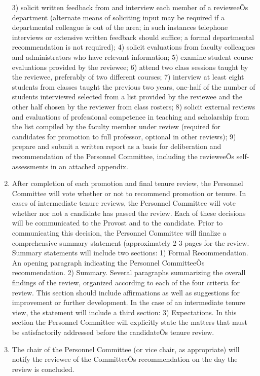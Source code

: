 \documentclass[letterpaper, 11pt]{article}
\begin{document}
\begin{enumerate}[label=\alph*)]
					3) solicit written feedback from and interview each member of a revieweeÕs department (alternate means of soliciting input may be required if a departmental colleague is out of the area; in such instances telephone interviews or extensive written feedback should suffice; a formal departmental recommendation is not required);
					4) solicit evaluations from faculty colleagues and administrators who have relevant information;
					5) examine student course evaluations provided by the reviewee;
					6) attend two class sessions taught by the reviewee, preferably of two different courses;
					7) interview at least eight students from classes taught the previous two years, one-half of the number of students interviewed selected from a list provided by the reviewee and the other half chosen by the reviewer from class rosters;
					8) solicit external reviews and evaluations of professional competence in teaching and scholarship from the list compiled by the faculty member under review (required for candidates for promotion to full professor, optional in other reviews);
					9) prepare and submit a written report as a basis for deliberation and recommendation of the Personnel Committee, including the revieweeÕs self-assessments in an attached appendix.
					\item{After completion of each promotion and final tenure review, the Personnel Committee will vote whether or not to recommend promotion or tenure.  In cases of intermediate tenure reviews, the Personnel Committee will vote whether nor not a candidate has passed the review.  Each of these decisions will be communicated to the Provost and to the candidate.  Prior to communicating this decision, the Personnel Committee will finalize a comprehensive summary statement (approximately 2-3 pages for the review.  Summary statements will include two sections:}
					1) Formal Recommendation.  An opening paragraph indicating the Personnel CommitteeÕs recommendation.
					2) Summary.  Several paragraphs summarizing the overall findings of the review, organized according to each of the four criteria for review.  This section should include affirmations as well as suggestions for improvement or further development.
					In the case of an intermediate tenure view, the statement will include a third section:
					3) Expectations.  In this section the Personnel Committee will explicitly state the matters that must be satisfactorily addressed before the candidateÕs tenure review.
					\item{  The chair of the Personnel Committee (or vice chair, as appropriate) will notify the reviewee of the CommitteeÕs recommendation on the day the review is concluded.}
				\end{enumerate}
\end{document}
